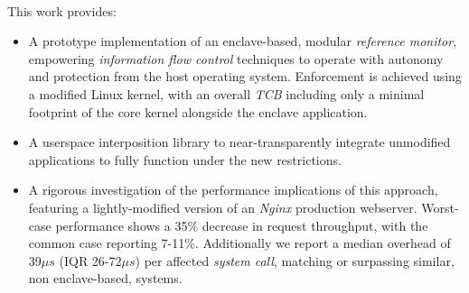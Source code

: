 \paragraph{} This work provides:
\begin{itemize}
    \item A prototype implementation of an enclave-based, modular \textit{reference monitor}, empowering \textit{information flow control} techniques to operate with autonomy and protection from the host operating system. Enforcement is achieved using a modified Linux kernel, with an overall \textit{TCB} including only a minimal footprint of the core kernel alongside the enclave application.
    \item A userspace interposition library to near-transparently integrate unmodified applications to fully function under the new restrictions.
    \item A rigorous investigation of the performance implications of this approach, featuring a lightly-modified version of an \textit{Nginx} production webserver. Worst-case performance shows a 35\% decrease in request throughput, with the common case reporting 7-11\%. Additionally we report a median overhead of 39$\mu s$ (IQR 26-72$\mu s$) per affected \textit{system call}, matching or surpassing similar, non enclave-based, systems.
\end{itemize}